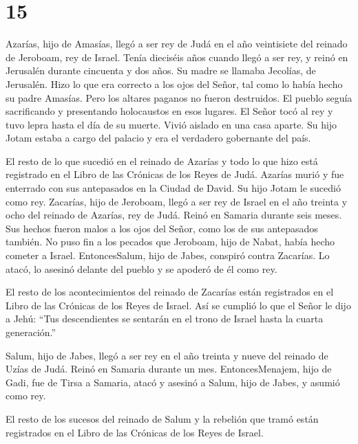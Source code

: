 \hypertarget{section-14}{%
\section{15}\label{section-14}}

 Azarías, hijo de Amasías, llegó a ser rey de Judá en el año
veintisiete del reinado de Jeroboam, rey de Israel.  Tenía
dieciséis años cuando llegó a ser rey, y reinó en Jerusalén durante
cincuenta y dos años. Su madre se llamaba Jecolías, de Jerusalén.
 Hizo lo que era correcto a los ojos del Señor, tal como lo
había hecho su padre Amasías.  Pero los altares paganos no
fueron destruidos. El pueblo seguía sacrificando y presentando
holocaustos en esos lugares.  El Señor tocó al rey y tuvo
lepra hasta el día de su muerte. Vivió aislado en una casa aparte. Su
hijo Jotam estaba a cargo del palacio y era el verdadero gobernante del
país.

 El resto de lo que sucedió en el reinado de Azarías y todo
lo que hizo está registrado en el Libro de las Crónicas de los Reyes de
Judá.  Azarías murió y fue enterrado con sus antepasados en
la Ciudad de David. Su hijo Jotam le sucedió como rey. 
Zacarías, hijo de Jeroboam, llegó a ser rey de Israel en el año treinta
y ocho del reinado de Azarías, rey de Judá. Reinó en Samaria durante
seis meses.  Sus hechos fueron malos a los ojos del Señor,
como los de sus antepasados también. No puso fin a los pecados que
Jeroboam, hijo de Nabat, había hecho cometer a Israel. 
EntoncesSalum, hijo de Jabes, conspiró contra Zacarías. Lo atacó, lo
asesinó delante del pueblo y se apoderó de él como rey.

 El resto de los acontecimientos del reinado de Zacarías
están registrados en el Libro de las Crónicas de los Reyes de Israel.
 Así se cumplió lo que el Señor le dijo a Jehú: ``Tus
descendientes se sentarán en el trono de Israel hasta la cuarta
generación.''

 Salum, hijo de Jabes, llegó a ser rey en el año treinta y
nueve del reinado de Uzías de Judá. Reinó en Samaria durante un mes.
 EntoncesMenajem, hijo de Gadi, fue de Tirsa a Samaria,
atacó y asesinó a Salum, hijo de Jabes, y asumió como rey.

 El resto de los sucesos del reinado de Salum y la rebelión
que tramó están registrados en el Libro de las Crónicas de los Reyes de
Israel.

